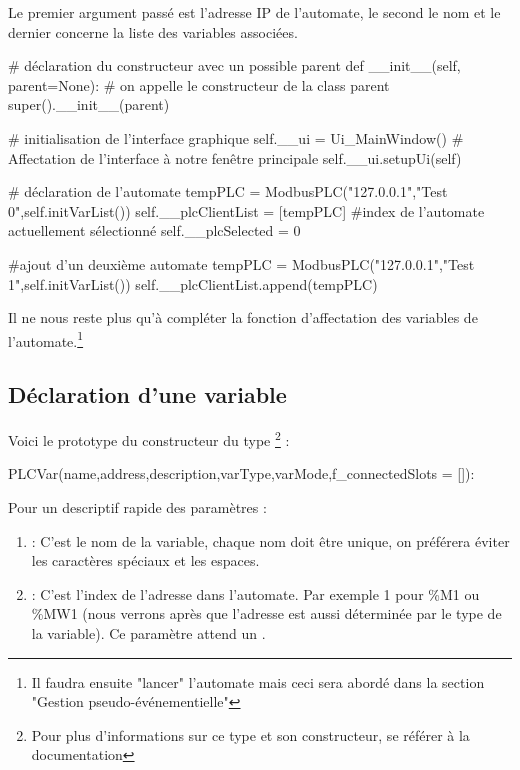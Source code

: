 {Le premier argument passé est l'adresse IP de l'automate, le second le nom et le dernier concerne la liste des variables associées.

\begin{Python}

	# déclaration du constructeur avec un possible parent
	def __init__(self, parent=None):
		# on appelle le constructeur de la class parent
		super().__init__(parent)

		# initialisation de l’interface graphique
		self.__ui = Ui_MainWindow()
		# Affectation de l’interface à notre fenêtre principale
		self.__ui.setupUi(self)

		# déclaration de l’automate
		tempPLC = ModbusPLC("127.0.0.1","Test 0",self.initVarList())
		self.__plcClientList = [tempPLC]
		#index de l'automate actuellement sélectionné
		self.__plcSelected = 0

		#ajout d'un deuxième automate
		tempPLC = ModbusPLC("127.0.0.1","Test 1",self.initVarList())
		self.__plcClientList.append(tempPLC)
\end{Python}

Il ne nous reste plus qu'à compléter la fonction d'affectation des variables de l'automate.\footnote{ Il faudra ensuite "lancer" l'automate mais ceci sera abordé dans la section "Gestion pseudo-événementielle"}


\subsection{Déclaration d'une variable}

Voici le prototype du constructeur du type \footnote{Pour plus d'informations sur ce type et son constructeur, se référer à la documentation} :
\begin{Python}
PLCVar(name,address,description,varType,varMode,f_connectedSlots = []):
\end{Python}
Pour un descriptif rapide des paramètres :
\begin{enumerate}
\item {} : C'est le nom de la variable, chaque nom doit être unique, on préférera éviter les caractères spéciaux et les espaces.

\item {} : C'est l'index de l'adresse dans l'automate. Par exemple 1 pour \%M1 ou \%MW1 (nous verrons après que l'adresse est aussi déterminée par le type de la variable). Ce paramètre attend un .


\end{enumerate}}
